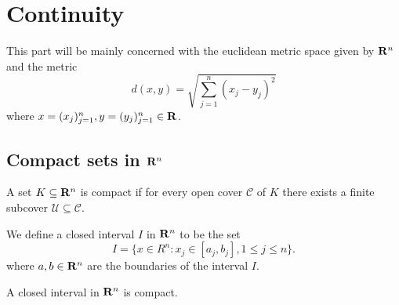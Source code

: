 \section{Continuity}

\begin{remark}
    This part will be mainly concerned with the euclidean metric space given by
    \(\mathbf{R}^n\) and the metric
    \[
        d(x, y) = \sqrt{\sum_{j=1}^n (x_j - y_j)^2}
    \]
    where \(x = (x_j)_{j=1}^n, y = (y_j)_{j=1}^n \in \mathbf{R}\).
\end{remark}

\subsection{Compact sets in \texorpdfstring{\(\mathbf{R}^n\)}{Rn}}

\begin{definition}
    A set \(K \subseteq \mathbf{R}^n\) is compact if for every open cover \(\mathcal C\)
    of \(K\) there exists a finite subcover \(\mathcal U \subseteq \mathcal C\).
\end{definition}

\begin{definition}
    We define a closed interval \(I\) in \(\mathbf{R}^n\) to be the set
    \[
        I = \{x \in R^n \colon x_j \in [a_j, b_j], 1 \leq j \leq n\}.
    \]
    where \(a, b \in \mathbf{R}^n\) are the boundaries of the interval \(I\).
\end{definition}

\begin{proposition}\label{prop: closed-interval compact}
    A closed interval in \(\mathbf{R}^n\) is compact.
\end{proposition}

